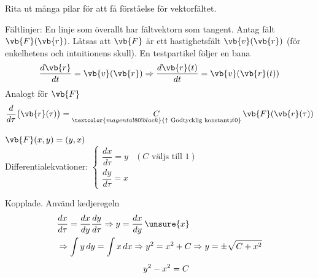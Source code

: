 \begin{minipage}{0.42\linewidth}
\end{minipage}
\begin{minipage}{0.56\linewidth}
Rita ut många pilar för att få förståelse för vektorfältet.
\end{minipage}

Fältlinjer: En linje som överallt har fältvektorn som tangent. Antag fält $\vb{F}(\vb{r})$. Låtsas att $\vb{F}$ är ett hastighetsfält $\vb{v}(\vb{r})$ (för enkelhetens och intuitionens skull). En testpartikel följer en bana
\[ \frac{d\vb{r}}{dt} = \vb{v}(\vb{r}) \Rightarrow \frac{d\vb{r}(t)}{dt} = \vb{v}(\vb{r}(t)) \]
Analogt för $\vb{F}$
\[ \frac{d}{d\tau}\big(\vb{r}(\tau)\big) = \underset{\textcolor{magenta!80!black}{\uparrow \text{ Godtycklig konstant} \neq 0}}{C}\,\vb{F}(\vb{r}(\tau)) \]

\begin{example}
$\vb{F}(x, y) = (y, x)$\\
Differentialekvationer: $\begin{cases} \dfrac{dx}{d\tau} = y & (C \text{ väljs till } 1) \\[1em] \dfrac{dy}{d\tau} = x \end{cases}$

Kopplade. Använd kedjeregeln
\begin{align*}
&\frac{dx}{d\tau} = \frac{dx}{dy}\frac{dy}{d\tau} \Rightarrow y = \frac{dx}{dy}\,\unsure{x} \\
&\Rightarrow \int y\,dy = \int x\,dx \Rightarrow y^2 = x^2 + C \Rightarrow y = \pm\sqrt{C + x^2} \\
&\phantom{\Rightarrow \int y\,dy = \int x\,dx \Rightarrow{}} y^2 - x^2 = C
\end{align*}
\end{example}
